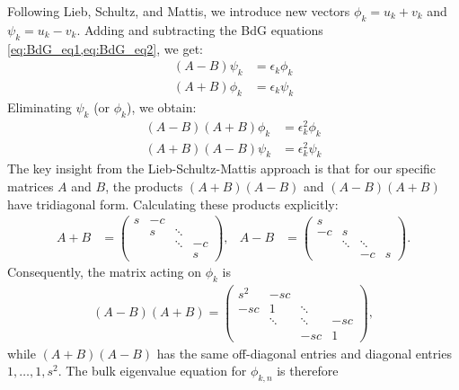 Following Lieb, Schultz, and Mattis, we introduce new vectors $\phi_k = u_k + v_k$ and $\psi_k = u_k - v_k$. Adding and subtracting the BdG equations \cref{eq:BdG_eq1,eq:BdG_eq2}, we get:
\begin{align}
    (A - B) \psi_k &= \epsilon_k \phi_k \label{eq:LSM_eq1}\\
    (A + B) \phi_k &= \epsilon_k \psi_k \label{eq:LSM_eq2}
\end{align}
Eliminating $\psi_k$ (or $\phi_k$), we obtain:
\begin{align}
    (A - B)(A + B) \phi_k &= \epsilon_k^2 \phi_k \label{eq:E2_phi}\\
    (A + B)(A - B) \psi_k &= \epsilon_k^2 \psi_k \label{eq:E2_psi}
\end{align}
The key insight from the Lieb-Schultz-Mattis approach is that for our specific matrices $A$ and $B$, the products $(A+B)(A-B)$ and $(A-B)(A+B)$ have tridiagonal form. Calculating these products explicitly:
\begin{align}
    A+B &=
    \begin{pmatrix}
        s      & -c     &        &        \\
               & s      & \ddots &        \\
               &        & \ddots & -c     \\
               &        &        & s
    \end{pmatrix},
    &
    A-B &=
    \begin{pmatrix}
        s      &        &        &        \\
        -c     & s      &        &        \\
               & \ddots & \ddots &        \\
               &        & -c     & s
    \end{pmatrix}.
\end{align}
Consequently, the matrix acting on $\phi_k$ is
\begin{align}
    (A-B)(A+B) =
    \begin{pmatrix}
        s^2 & -sc &        &        \\
        -sc & 1   & \ddots &        \\
            & \ddots & \ddots & -sc \\
            &        & -sc & 1
    \end{pmatrix},
    \label{eq:obc_phi_tridiagonal}
\end{align}
while $(A+B)(A-B)$ has the same off-diagonal entries and diagonal entries $1,\ldots,1,s^2$.  The bulk eigenvalue equation for $\phi_{k,n}$ is therefore
